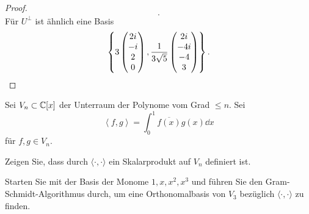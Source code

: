 \begin{proof}
\[.\] 
F\"{u}r $U^\perp$ ist ähnlich eine Basis
\[
\left\{ 3\begin{pmatrix} 2i \\ -i \\ 2 \\ 0 \end{pmatrix} , \frac{1}{3\sqrt{5} }\begin{pmatrix} 2i \\ -4i \\ -4 \\ 3 \end{pmatrix}  \right\} 
.\qedhere\] 
\end{proof}
\begin{Problem}
	Sei $V_n\subset \mathbb{C}[x]$ der Unterraum der Polynome vom Grad $\leq n$. Sei
	\[
		\left<f,g \right> = \int_0^1 \overline{f(x)}g(x)\dd{x}
	\]
	f\"{u}r $f,g\in V_n$.
	\begin{parts}
	\item Zeigen Sie, dass durch $\langle\cdot,\cdot\rangle$ ein Skalarprodukt auf $V_n$ definiert ist.
	\item Starten Sie mit der Basis der Monome $1,x,x^2,x^3$ und f\"{u}hren Sie den Gram-Schmidt-Algorithmus durch, um eine Orthonomalbasis von $V_3$ bezüglich $\langle\cdot,\cdot\rangle$ zu finden.
	\end{parts}
\end{Problem}

